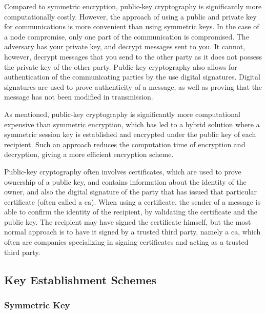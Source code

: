 Compared to symmetric encryption, public-key cryptography is significantly more computationally costly. However, the approach of using a public and private key for communications is more convenient than using symmetric keys. In the case of a node compromise, only one part of the communication is compromised. The adversary has your private key, and decrypt messages sent to you. It cannot, however, decrypt messages that you send to the other party as it does not possess the private key of the other party. Public-key cryptography also allows for authentication of the communicating parties by the use digital signatures. Digital signatures are used to prove authenticity of a message, as well as proving that the message has not been modified in transmission.

As mentioned, public-key cryptography is significantly more computational expensive than symmetric encryption, which has led to a hybrid solution where a symmetric session key is established and encrypted under the public key of each recipient. Such an approach reduces the computation time of encryption and decryption, giving a more efficient encryption scheme.

Public-key cryptography often involves certificates, which are used to prove ownership of a public key, and contains information about the identity of the owner, and also the digital signature of the party that has issued that particular certificate (often called a \gls{ca}). When using a certificate, the sender of a message is able to confirm the identity of the recipient, by validating the certificate and the public key. The recipient may have signed the certificate himself, but the most normal approach is to have it signed by a trusted third party, namely a \gls{ca}, which often are companies specializing in signing certificates and acting as a trusted third party.

\subsection{Key Establishment Schemes}

\label{subsec:keys-schems}

\subsubsection{Symmetric Key}

